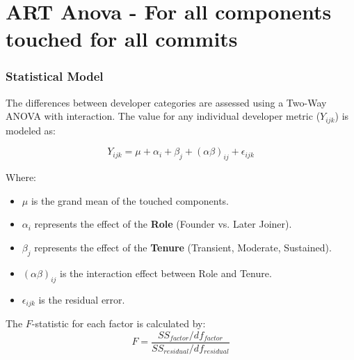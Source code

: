 \section{ART Anova - For all components touched for all commits} 
\label{sec:codebase_graph_latex.repository_graph.component_time_series.ART_anovaall commits} 





\subsubsection*{Statistical Model}
The differences between developer categories are assessed using a Two-Way ANOVA 
with interaction. The value for any individual developer metric ($Y_{ijk}$) 
is modeled as:

\begin{equation}
    Y_{ijk} = \mu + \alpha_i + \beta_j + (\alpha\beta)_{ij} + \epsilon_{ijk}
\end{equation}

Where:
\begin{itemize}
    \item $\mu$ is the grand mean of the touched components.
    \item $\alpha_i$ represents the effect of the \textbf{Role} (Founder vs. Later Joiner).
    \item $\beta_j$ represents the effect of the \textbf{Tenure} (Transient, Moderate, Sustained).
    \item $(\alpha\beta)_{ij}$ is the interaction effect between Role and Tenure.
    \item $\epsilon_{ijk}$ is the residual error.
\end{itemize}

The $F$-statistic for each factor is calculated by:
\begin{equation}
    F = \frac{SS_{factor} / df_{factor}}{SS_{residual} / df_{residual}}
\end{equation}

\newpage 
